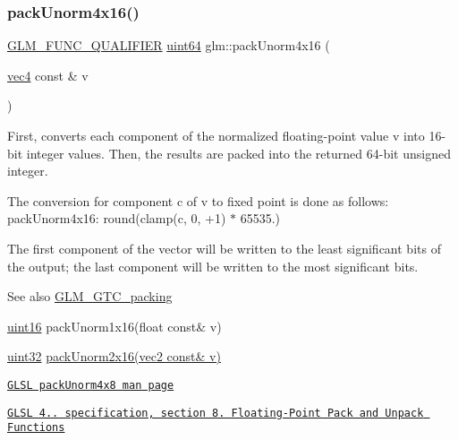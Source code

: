 \subsubsection{\texorpdfstring{pack\+Unorm4x16()}{packUnorm4x16()}}
{\footnotesize\ttfamily \hyperlink{setup_8hpp_a33fdea6f91c5f834105f7415e2a64407}{G\+L\+M\+\_\+\+F\+U\+N\+C\+\_\+\+Q\+U\+A\+L\+I\+F\+I\+ER} \hyperlink{group__gtc__type__precision_gae3632bf9b37da66233d78930dd06378a}{uint64} glm\+::pack\+Unorm4x16 (\begin{DoxyParamCaption}\item[{\hyperlink{group__core__types_ga5881b1b022d7fd1b7218f5916532dd02}{vec4} const \&}]{v }\end{DoxyParamCaption})}

First, converts each component of the normalized floating-\/point value v into 16-\/bit integer values. Then, the results are packed into the returned 64-\/bit unsigned integer.

The conversion for component c of v to fixed point is done as follows\+: pack\+Unorm4x16\+: round(clamp(c, 0, +1) $\ast$ 65535.)

The first component of the vector will be written to the least significant bits of the output; the last component will be written to the most significant bits.

\begin{DoxySeeAlso}{See also}
\hyperlink{group__gtc__packing}{G\+L\+M\+\_\+\+G\+T\+C\+\_\+packing} 

\hyperlink{group__gtc__type__precision_gad8c2939e1fdd8e5828b31d95c52255d5}{uint16} pack\+Unorm1x16(float const\& v) 

\hyperlink{group__gtc__type__precision_ga202b6a53c105fcb7e531f9b443518451}{uint32} \hyperlink{group__core__func__packing_ga0e2d107039fe608a209497af867b85fb}{pack\+Unorm2x16(vec2 const\& v)} 

\href{http://www.opengl.org/sdk/docs/manglsl/xhtml/packUnorm4x8.xml}{\tt G\+L\+SL pack\+Unorm4x8 man page} 

\href{http://www.opengl.org/registry/doc/GLSLangSpec.4.20.8.pdf}{\tt G\+L\+SL 4.. specification, section 8. Floating-\/\+Point Pack and Unpack Functions} 
\end{DoxySeeAlso}
\mbox{\label{group__gtc__packing_gad493c9f130e91dd8a4b360b05dcea573}} 
